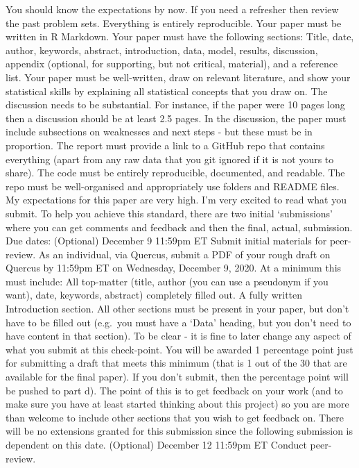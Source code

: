 \documentclass[
]{book}
\begin{document}
You should know the expectations by now. If you need a refresher then review the past problem sets.
Everything is entirely reproducible.
Your paper must be written in R Markdown.
Your paper must have the following sections:
Title, date, author, keywords, abstract, introduction, data, model, results, discussion, appendix (optional, for supporting, but not critical, material), and a reference list.
Your paper must be well-written, draw on relevant literature, and show your statistical skills by explaining all statistical concepts that you draw on.
The discussion needs to be substantial. For instance, if the paper were 10 pages long then a discussion should be at least 2.5 pages. In the discussion, the paper must include subsections on weaknesses and next steps - but these must be in proportion.
The report must provide a link to a GitHub repo that contains everything (apart from any raw data that you git ignored if it is not yours to share). The code must be entirely reproducible, documented, and readable. The repo must be well-organised and appropriately use folders and README files.
My expectations for this paper are very high. I'm very excited to read what you submit. To help you achieve this standard, there are two initial `submissions' where you can get comments and feedback and then the final, actual, submission.
Due dates:
(Optional) December 9 11:59pm ET
Submit initial materials for peer-review.
As an individual, via Quercus, submit a PDF of your rough draft on Quercus by 11:59pm ET on Wednesday, December 9, 2020.
At a minimum this must include:
All top-matter (title, author (you can use a pseudonym if you want), date, keywords, abstract) completely filled out.
A fully written Introduction section.
All other sections must be present in your paper, but don't have to be filled out (e.g.~you must have a `Data' heading, but you don't need to have content in that section).
To be clear - it is fine to later change any aspect of what you submit at this check-point.
You will be awarded 1 percentage point just for submitting a draft that meets this minimum (that is 1 out of the 30 that are available for the final paper). If you don't submit, then the percentage point will be pushed to part d).
The point of this is to get feedback on your work (and to make sure you have at least started thinking about this project) so you are more than welcome to include other sections that you wish to get feedback on.
There will be no extensions granted for this submission since the following submission is dependent on this date.
(Optional) December 12 11:59pm ET
Conduct peer-review.
\end{document}
